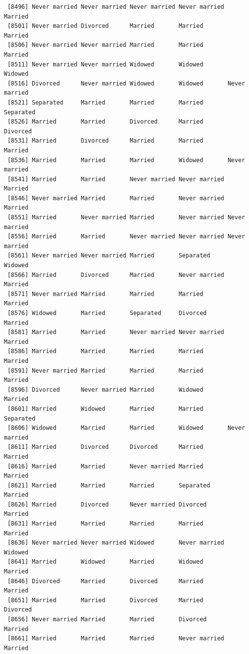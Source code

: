 \documentclass[
  letterpaper,
  DIV=11,
  numbers=noendperiod,
  oneside]{scrartcl}
\begin{document}
\begin{verbatim}
 [8496] Never married Never married Never married Never married Married      
 [8501] Never married Divorced      Married       Married       Married      
 [8506] Never married Never married Married       Married       Married      
 [8511] Never married Never married Widowed       Widowed       Widowed      
 [8516] Divorced      Never married Widowed       Widowed       Never married
 [8521] Separated     Married       Married       Married       Separated    
 [8526] Married       Married       Divorced      Married       Divorced     
 [8531] Married       Divorced      Married       Married       Married      
 [8536] Married       Married       Married       Widowed       Never married
 [8541] Married       Married       Never married Never married Married      
 [8546] Never married Married       Married       Never married Married      
 [8551] Married       Never married Married       Never married Never married
 [8556] Married       Married       Never married Never married Never married
 [8561] Never married Never married Married       Separated     Widowed      
 [8566] Married       Divorced      Married       Never married Married      
 [8571] Never married Married       Married       Married       Married      
 [8576] Widowed       Married       Separated     Divorced      Married      
 [8581] Married       Married       Never married Never married Married      
 [8586] Married       Married       Married       Married       Married      
 [8591] Never married Married       Married       Married       Married      
 [8596] Divorced      Never married Married       Widowed       Married      
 [8601] Married       Widowed       Married       Married       Separated    
 [8606] Widowed       Married       Married       Widowed       Never married
 [8611] Married       Divorced      Divorced      Married       Married      
 [8616] Married       Married       Never married Married       Married      
 [8621] Married       Married       Married       Separated     Married      
 [8626] Married       Divorced      Never married Divorced      Married      
 [8631] Married       Married       Married       Married       Married      
 [8636] Never married Never married Widowed       Never married Widowed      
 [8641] Married       Widowed       Married       Widowed       Married      
 [8646] Divorced      Married       Divorced      Married       Married      
 [8651] Married       Married       Divorced      Married       Divorced     
 [8656] Never married Married       Married       Divorced      Married      
 [8661] Married       Married       Married       Never married Married      

\end{verbatim}
\end{document}
